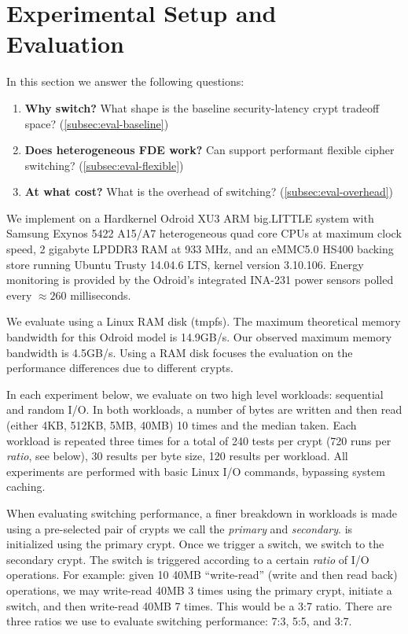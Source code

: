 \section{Experimental Setup and Evaluation}\label{sec:eval}

In this section we answer the following questions:

\begin{enumerate}
 \item {\bf Why switch?} What shape is the baseline security-latency crypt
 tradeoff space? (\cref{subsec:eval-baseline})
 \item {\bf Does heterogeneous FDE work?} Can \sys support performant flexible
 cipher switching? (\cref{subsec:eval-flexible})
 \item {\bf At what cost?} What is the overhead of switching?
 (\cref{subsec:eval-overhead})
\end{enumerate}

 We implement \sys on a Hardkernel Odroid XU3 ARM
big.LITTLE system with Samsung Exynos 5422 A15/A7 heterogeneous quad core CPUs
at maximum clock speed, 2 gigabyte LPDDR3 RAM at 933 MHz, and an eMMC5.0 HS400
backing store running Ubuntu Trusty 14.04.6 LTS, kernel version 3.10.106. Energy
monitoring is provided by the Odroid's integrated INA-231 power sensors polled
every $\approx{260}$ milliseconds.

We evaluate \sys using a Linux RAM disk (tmpfs). The maximum theoretical memory
bandwidth for this Odroid model is 14.9GB/s\@. Our observed maximum memory
bandwidth is 4.5GB/s. Using a RAM disk focuses the evaluation on the performance
differences due to different crypts.

 In each experiment below, we evaluate \sys on two high
level workloads: sequential and random I/O. In both workloads, a number of bytes
are written and then read (either 4KB, 512KB, 5MB, 40MB) 10 times and the median
taken. Each workload is repeated three times for a total of 240 tests per crypt
(720 runs per {\em ratio}, see below), 30 results per byte size, 120 results per
workload. All experiments are performed with basic Linux I/O commands, bypassing
system caching.

When evaluating switching performance, a finer breakdown in workloads is made
using a pre-selected pair of crypts we call the {\em primary} and {\em
secondary}. \sys is initialized using the primary crypt. Once we trigger a
switch, we switch to the secondary crypt. The switch is triggered according to a
certain {\em ratio} of I/O operations. For example: given 10 40MB ``write-read''
(write and then read back) operations, we may write-read 40MB 3 times using the
primary crypt, initiate a switch, and then write-read 40MB 7 times. This would
be a 3:7 ratio. There are three ratios we use to evaluate switching performance:
7:3, 5:5, and 3:7.


